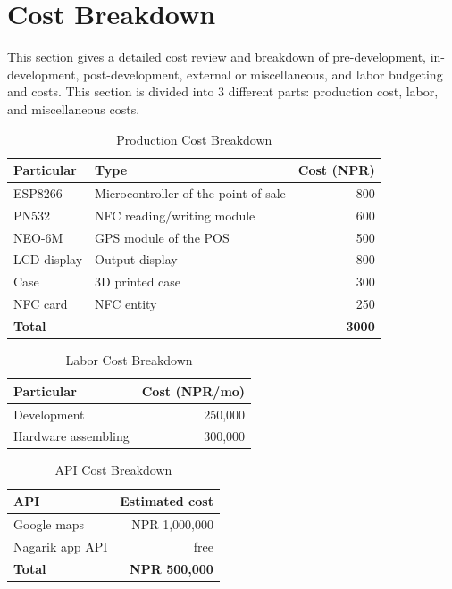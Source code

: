 \documentclass[manuscript,review,anonymous]{acmart}
\begin{document}
 \section{Cost Breakdown}
This section gives a detailed cost review and breakdown of pre-development, in-development, post-development, external or miscellaneous, and labor budgeting and costs. This section is divided into 3 different parts: production cost, labor, and miscellaneous costs.

\begin{table}[H]
  \centering
  \caption{Production Cost Breakdown}
  \label{tab:production_cost}
  \begin{tabularx}{\columnwidth}{p{5em} L r}
    \toprule
    \textbf{Particular} & \textbf{Type} & \textbf{Cost (NPR)} \\
    \midrule
    ESP8266 & Microcontroller of the point-of-sale & 800 \\
    PN532 & NFC reading/writing module & 600 \\
    NEO-6M & GPS module of the POS & 500 \\
    LCD display & Output display & 800 \\
    Case & 3D printed case & 300 \\
    NFC card & NFC entity & 250 \\
    \midrule
    \textbf{Total} & & \textbf{3000} \\
    \bottomrule
  \end{tabularx}
\end{table}



\begin{table}[H]
  \centering
  \caption{Labor Cost Breakdown}
  \label{tab:labor_cost}
  \begin{tabularx}{\columnwidth}{L r}
    \toprule
    \textbf{Particular} & \textbf{Cost (NPR/mo)} \\
    \midrule
    Development & 250,000 \\
    Hardware assembling & 300,000 \\
    \bottomrule
  \end{tabularx}
\end{table}


\begin{table}[H]
  \centering
  \caption{API Cost Breakdown}
  \label{tab:api_cost}
  \begin{tabularx}{\columnwidth}{L r}
    \toprule
    \textbf{API} & \textbf{Estimated cost} \\
    \midrule
    Google maps & NPR 1,000,000 \\
    Nagarik app API & free \\
    \midrule
    \textbf{Total} & \textbf{NPR 500,000} \\
    \bottomrule
  \end{tabularx}
\end{table}
\end{document}
